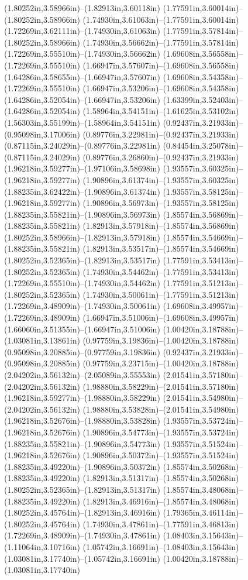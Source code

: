 (1.80252in,3.58966in)--(1.82913in,3.60118in) (1.77591in,3.60014in)--(1.80252in,3.58966in) (1.74930in,3.61063in)--(1.77591in,3.60014in) (1.72269in,3.62111in)--(1.74930in,3.61063in) (1.77591in,3.57814in)--(1.80252in,3.58966in) (1.74930in,3.56662in)--(1.77591in,3.57814in) (1.72269in,3.55510in)--(1.74930in,3.56662in) (1.69608in,3.56558in)--(1.72269in,3.55510in) (1.66947in,3.57607in)--(1.69608in,3.56558in) (1.64286in,3.58655in)--(1.66947in,3.57607in) (1.69608in,3.54358in)--(1.72269in,3.55510in) (1.66947in,3.53206in)--(1.69608in,3.54358in) (1.64286in,3.52054in)--(1.66947in,3.53206in) (1.63399in,3.52403in)--(1.64286in,3.52054in) (1.58964in,3.54151in)--(1.61625in,3.53102in) (1.56303in,3.55199in)--(1.58964in,3.54151in) (0.92437in,3.21933in)--(0.95098in,3.17006in) (0.89776in,3.22981in)--(0.92437in,3.21933in) (0.87115in,3.24029in)--(0.89776in,3.22981in) (0.84454in,3.25078in)--(0.87115in,3.24029in) (0.89776in,3.26860in)--(0.92437in,3.21933in) (1.96218in,3.59277in)--(1.97106in,3.58698in) (1.93557in,3.60325in)--(1.96218in,3.59277in) (1.90896in,3.61374in)--(1.93557in,3.60325in) (1.88235in,3.62422in)--(1.90896in,3.61374in) (1.93557in,3.58125in)--(1.96218in,3.59277in) (1.90896in,3.56973in)--(1.93557in,3.58125in) (1.88235in,3.55821in)--(1.90896in,3.56973in) (1.85574in,3.56869in)--(1.88235in,3.55821in) (1.82913in,3.57918in)--(1.85574in,3.56869in) (1.80252in,3.58966in)--(1.82913in,3.57918in) (1.85574in,3.54669in)--(1.88235in,3.55821in) (1.82913in,3.53517in)--(1.85574in,3.54669in) (1.80252in,3.52365in)--(1.82913in,3.53517in) (1.77591in,3.53413in)--(1.80252in,3.52365in) (1.74930in,3.54462in)--(1.77591in,3.53413in) (1.72269in,3.55510in)--(1.74930in,3.54462in) (1.77591in,3.51213in)--(1.80252in,3.52365in) (1.74930in,3.50061in)--(1.77591in,3.51213in) (1.72269in,3.48909in)--(1.74930in,3.50061in) (1.69608in,3.49957in)--(1.72269in,3.48909in) (1.66947in,3.51006in)--(1.69608in,3.49957in) (1.66060in,3.51355in)--(1.66947in,3.51006in) (1.00420in,3.18788in)--(1.03081in,3.13861in) (0.97759in,3.19836in)--(1.00420in,3.18788in) (0.95098in,3.20885in)--(0.97759in,3.19836in) (0.92437in,3.21933in)--(0.95098in,3.20885in) (0.97759in,3.23715in)--(1.00420in,3.18788in) (2.04202in,3.56132in)--(2.05089in,3.55553in) (2.01541in,3.57180in)--(2.04202in,3.56132in) (1.98880in,3.58229in)--(2.01541in,3.57180in) (1.96218in,3.59277in)--(1.98880in,3.58229in) (2.01541in,3.54980in)--(2.04202in,3.56132in) (1.98880in,3.53828in)--(2.01541in,3.54980in) (1.96218in,3.52676in)--(1.98880in,3.53828in) (1.93557in,3.53724in)--(1.96218in,3.52676in) (1.90896in,3.54773in)--(1.93557in,3.53724in) (1.88235in,3.55821in)--(1.90896in,3.54773in) (1.93557in,3.51524in)--(1.96218in,3.52676in) (1.90896in,3.50372in)--(1.93557in,3.51524in) (1.88235in,3.49220in)--(1.90896in,3.50372in) (1.85574in,3.50268in)--(1.88235in,3.49220in) (1.82913in,3.51317in)--(1.85574in,3.50268in) (1.80252in,3.52365in)--(1.82913in,3.51317in) (1.85574in,3.48068in)--(1.88235in,3.49220in) (1.82913in,3.46916in)--(1.85574in,3.48068in) (1.80252in,3.45764in)--(1.82913in,3.46916in) (1.79365in,3.46114in)--(1.80252in,3.45764in) (1.74930in,3.47861in)--(1.77591in,3.46813in) (1.72269in,3.48909in)--(1.74930in,3.47861in) (1.08403in,3.15643in)--(1.11064in,3.10716in) (1.05742in,3.16691in)--(1.08403in,3.15643in) (1.03081in,3.17740in)--(1.05742in,3.16691in) (1.00420in,3.18788in)--(1.03081in,3.17740in) 